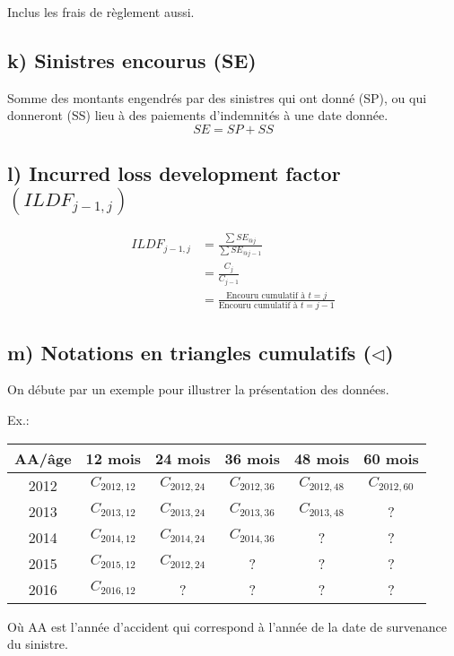Inclus les frais de règlement aussi.

\subsection*{k) Sinistres encourus (SE)}
Somme des montants engendrés par des sinistres qui ont donné (SP), ou qui donneront (SS) lieu à des paiements d'indemnités à une date donnée.
$$ SE = SP + SS $$

\subsection*{l) Incurred loss development factor $(ILDF_{j-1, j})$}

\begin{align*}
ILDF_{j-1, j} &= \frac{\sum SE_{@j}}{\sum SE_{@j-1}} \\
&= \frac{C_j}{C_{j-1}} \\
&= \frac{\text{Encouru cumulatif à $t = j$}}{\text{Encouru cumulatif à $t = j-1$}}
\end{align*}

\subsection*{m) Notations en triangles cumulatifs ($\triangleleft$)}
On débute par un exemple pour illustrer la présentation des données.

Ex.:\\

\begin{center}
\begin{tabular}{|c|c|c|c|c|c|}
  \hline
   AA/âge & 12 mois & 24 mois & 36 mois & 48 mois & 60 mois \\
  \hline
  2012 & $C_{2012, 12}$ & $C_{2012, 24}$ & $C_{2012, 36}$ & $C_{2012, 48}$ & $C_{2012, 60}$\\
  2013 & $C_{2013, 12}$ & $C_{2013, 24}$ & $C_{2013, 36}$ & $C_{2013, 48}$ & ?\\
  2014 & $C_{2014, 12}$ & $C_{2014, 24}$ & $C_{2014, 36}$ & ? & ?\\ 
  2015 & $C_{2015, 12}$ & $C_{2012, 24}$ & ? & ? & ? \\
  2016 & $C_{2016, 12}$ & ? & ? & ? & ?\\ 
  \hline
\end{tabular}
\end{center}

Où AA est l'année d'accident qui correspond à l'année de la date de survenance du sinistre.

